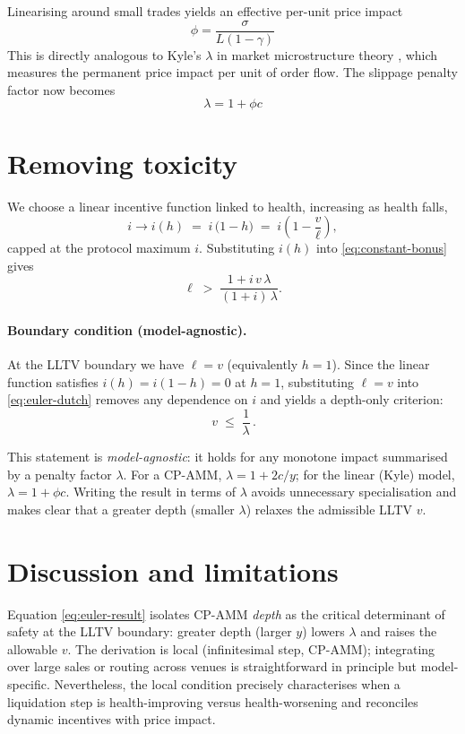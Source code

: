 \documentclass[11pt]{article}
\begin{document}
Linearising around small trades yields an effective per-unit price impact
\[
\phi = \frac{\sigma}{L(1-\gamma)}
\]
This is directly analogous to Kyle’s $\lambda$ in market microstructure theory \cite{Kyle1985}, which measures the permanent price impact per unit of order flow. The slippage penalty factor now becomes
\[
\lambda = 1 + \phi c
\]

\section{Removing toxicity}
We choose a linear incentive function linked to health, increasing as health falls,
\[
i \to i(h) \;=\; i\,\bigl(1-h\bigr)
\;=\; i\!\left(1 - \frac{v}{\ell}\right),
\]
capped at the protocol maximum \(i\). Substituting \(i(h)\) into \eqref{eq:constant-bonus} gives
\begin{equation}
\ell \;>\; \frac{1 + i\,v\,\lambda}{(1+i)\,\lambda}.
\label{eq:euler-dutch}
\end{equation}

\paragraph{Boundary condition (model-agnostic).}
At the LLTV boundary we have $\ell = v$ (equivalently $h=1$). Since the linear function satisfies $i(h)=i(1-h)=0$ at $h=1$, substituting $\ell=v$ into \eqref{eq:euler-dutch} removes any dependence on $i$ and yields a depth-only criterion:
\begin{equation}
\boxed{\, v \;\le\; \frac{1}{\lambda}\,}.
\label{eq:euler-result}
\end{equation}

\noindent
This statement is \emph{model-agnostic}: it holds for any monotone impact summarised by a penalty factor $\lambda$. For a CP-AMM, $\lambda=1+2c/y$; for the linear (Kyle) model, $\lambda=1+\phi c$. Writing the result in terms of $\lambda$ avoids unnecessary specialisation and makes clear that a greater depth (smaller $\lambda$) relaxes the admissible LLTV $v$.


\section{Discussion and limitations}
Equation \eqref{eq:euler-result} isolates CP-AMM \emph{depth} as the critical determinant of safety at the LLTV boundary: greater depth (larger \(y\)) lowers \(\lambda\) and raises the allowable \(v\). The derivation is local (infinitesimal step, CP-AMM); integrating over large sales or routing across venues is straightforward in principle but model-specific. Nevertheless, the local condition precisely characterises when a liquidation step is health-improving versus health-worsening and reconciles dynamic incentives with price impact.
\end{document}
